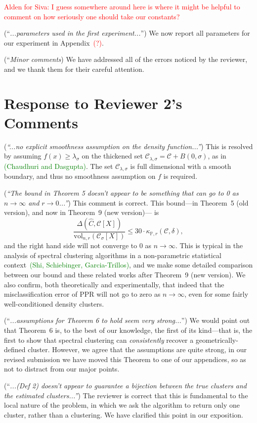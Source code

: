 \documentclass{article}
\newcommand{\vol}{\mathrm{vol}}
\newcommand{\1}{\mathbf{1}}
\newcommand{\mc}[1]{\mathcal{#1}}
\newcommand{\Pbb}{\mathbb{P}}
\newcommand{\wh}[1]{\widehat{#1}}
\theoremstyle{alden}
\theoremstyle{aldenthm}
\theoremstyle{definition}
\theoremstyle{remark}
\begin{document}
\textcolor{red}{Alden for Siva: I guess somewhere around here is where it might be helpful to comment on how seriously one should take our constants?}

(``\textit{...parameters used in the first experiment...}'') We now report all parameters for our experiment in Appendix~\textcolor{red}{(?)}. 

(``\textit{Minor comments}) We have addressed all of the errors noticed by the reviewer, and we thank them for their careful attention. 

\section{Response to Reviewer 2's Comments}

(\textit{``...no explicit smoothness assumption on the density function...''}) This is resolved by assuming $f(x) \geq \lambda_{\sigma}$ on the thickened set $\mc{C}_{\lambda, \sigma} = \mc{C} + B(0,\sigma)$, as in \textcolor{green}{(Chaudhuri and Dasgupta)}. The set $\mc{C}_{\lambda, \sigma}$ is full dimensional with a smooth boundary, and thus no smoothness assumption on $f$ is required.

(\textit{``The bound in Theorem 5 doesn't appear to be something that can go to 0 as $n \to \infty$ and $r \to 0$...''}) This comment is correct. This bound---in Theorem~5 (old version), and now in Theorem~9 (new version)--- is
\begin{equation}
\label{eqn:volume_ssd_ppr}
\frac{\Delta(\wh{C},\mc{C}[X])}{\vol_{n,r}(\mc{C}_{\sigma}[X])} \leq 30 \cdot \kappa_{\Pbb,r}(\mc{C},\delta),
\end{equation}
and the right hand side will not converge to $0$ as $n \to \infty$. This is typical in the analysis of spectral clustering algorithms in a non-parametric statistical context~\textcolor{green}{(Shi, Schiebinger, Garcia-Trillos)}, and we make some detailed comparison between our bound and these related works after Theorem~9 (new version). We also confirm, both theoretically and experimentally, that indeed that the misclassification error of PPR will not go to zero as $n \to \infty$, even for some fairly well-conditioned density clusters.

(``\textit{...assumptions for Theorem 6 to hold seem very strong...}'')  We would point out that Theorem~6  is, to the best of our knowledge, the first of its kind---that is, the first to show that spectral clustering can \emph{consistently} recover a geometrically-defined cluster. However, we agree that the assumptions are quite strong, in our revised submission we have moved this Theorem to one of our appendices, so as not to distract from our major points. 

(``\textit{...(Def 2) doesn't appear to guarantee a bijection between the true clusters and the estimated clusters...''}) The reviewer is correct that this is fundamental to the local nature of the problem, in which we ask the algorithm to return only one cluster, rather than a clustering. We have clarified this point in our exposition. 
\end{document}
